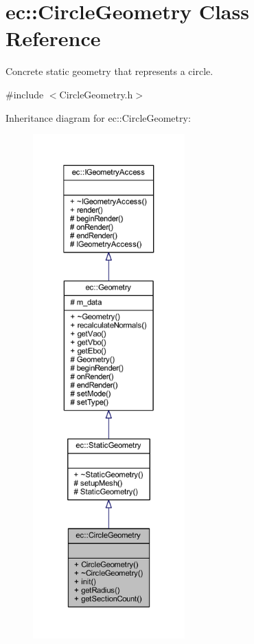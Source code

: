 \hypertarget{classec_1_1_circle_geometry}{}\section{ec\+:\+:Circle\+Geometry Class Reference}
\label{classec_1_1_circle_geometry}


Concrete static geometry that represents a circle.  




{\ttfamily \#include $<$Circle\+Geometry.\+h$>$}



Inheritance diagram for ec\+:\+:Circle\+Geometry\+:\nopagebreak
\begin{figure}[H]
\begin{center}
\leavevmode
\includegraphics[height=550pt]{classec_1_1_circle_geometry__inherit__graph}
\end{center}
\end{figure}


